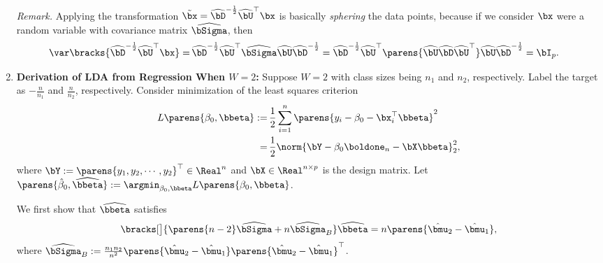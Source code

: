 \documentclass[12pt]{article}
\begin{document}
\begin{enumerate}[label=\textbf{\arabic*.}]
	\textit{Remark.} Applying the transformation $\tilde{\bx} = \widehat{\bD}^{-\frac{1}{2}} \widehat{\bU}^\top \bx$ is basically \emph{sphering} the data points, because if we consider $\bx$ were a random variable with covariance matrix $\widehat{\bSigma}$, then 
	\begin{align*}
		\var \bracks{\widehat{\bD}^{-\frac{1}{2}} \widehat{\bU}^\top \bx} = & \, \widehat{\bD}^{-\frac{1}{2}} \widehat{\bU}^\top \widehat{\bSigma} \widehat{\bU} \widehat{\bD}^{-\frac{1}{2}} 
		= \widehat{\bD}^{-\frac{1}{2}} \widehat{\bU}^\top \parens{\widehat{\bU} \widehat{\bD} \widehat{\bU}^\top} \widehat{\bU} \widehat{\bD}^{-\frac{1}{2}} 
		= \bI_p. 
	\end{align*}
	
	\item \textbf{Derivation of LDA from Regression When $W = 2$:} Suppose $W = 2$ with class sizes being $n_1$ and $n_2$, respectively. Label the target as $-\frac{n}{n_1}$ and $\frac{n}{n_2}$, respectively. Consider minimization of the least squares criterion
	\begin{align*}
		L \parens{\beta_0, \bbeta} := & \,\frac{1}{2} \sum_{i=1}^n \parens{y_i - \beta_0 - \bx_i^\top \bbeta}^2 \\ 
		= & \, \frac{1}{2} \norm{\bY - \beta_0 \boldone_n - \bX \bbeta}_2^2, 
	\end{align*}
	where $\bY := \parens{y_1, y_2, \cdots, y_2}^\top \in \Real^n$ and $\bX \in \Real^{n \times p}$ is the design matrix. Let $\parens{\hat{\beta}_0, \widehat{\bbeta}} := \argmin_{\beta_0, \bbeta} L \parens{\beta_0, \bbeta}$. 
	
	We first show that $\widehat{\bbeta}$ satisfies 
	\begin{align}\label{eq-ex4.2-goal}
		\bracks[\big]{ \parens{n - 2} \widehat{\bSigma} + n \widehat{\bSigma}_B } \widehat{\bbeta} = n \parens{\hat{\bmu}_2 - \hat{\bmu}_1}, 
	\end{align}
	where $\widehat{\bSigma}_B := \frac{n_1 n_2}{n^2} \parens{\hat{\bmu}_2 - \hat{\bmu}_1} \parens{\hat{\bmu}_2 - \hat{\bmu}_1}^\top$. 
	

\end{enumerate}
\end{document}
